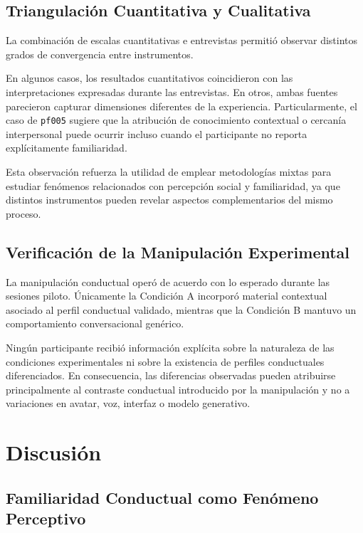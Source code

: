 \documentclass[sigconf, nonacm, language=spanish]{acmart}
\begin{document}
\subsection{Triangulación Cuantitativa y Cualitativa}

La combinación de escalas cuantitativas e entrevistas permitió observar distintos grados de convergencia entre instrumentos.

En algunos casos, los resultados cuantitativos coincidieron con las interpretaciones expresadas durante las entrevistas. En otros, ambas fuentes parecieron capturar dimensiones diferentes de la experiencia. Particularmente, el caso de \texttt{pf005} sugiere que la atribución de conocimiento contextual o cercanía interpersonal puede ocurrir incluso cuando el participante no reporta explícitamente familiaridad.

Esta observación refuerza la utilidad de emplear metodologías mixtas para estudiar fenómenos relacionados con percepción social y familiaridad, ya que distintos instrumentos pueden revelar aspectos complementarios del mismo proceso.

\subsection{Verificación de la Manipulación Experimental}

La manipulación conductual operó de acuerdo con lo esperado durante las sesiones piloto. Únicamente la Condición A incorporó material contextual asociado al perfil conductual validado, mientras que la Condición B mantuvo un comportamiento conversacional genérico.

Ningún participante recibió información explícita sobre la naturaleza de las condiciones experimentales ni sobre la existencia de perfiles conductuales diferenciados. En consecuencia, las diferencias observadas pueden atribuirse principalmente al contraste conductual introducido por la manipulación y no a variaciones en avatar, voz, interfaz o modelo generativo.

\section{Discusión}

\subsection{Familiaridad Conductual como Fenómeno Perceptivo}
\end{document}
